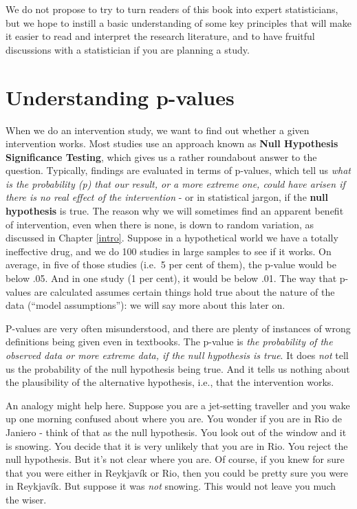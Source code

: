 \documentclass{krantz}
\begin{document}
We do not propose to try to turn readers of this book into expert statisticians, but we hope to instill a basic understanding of some key principles that will make it easier to read and interpret the research literature, and to have fruitful discussions with a statistician if you are planning a study.

\hypertarget{understanding-p-values}{%
\section{Understanding p-values}\label{understanding-p-values}}

When we do an intervention study, we want to find out whether a given intervention works. Most studies use an approach known as \textbf{Null Hypothesis Significance Testing}, which gives us a rather roundabout answer to the question. Typically, findings are evaluated in terms of p-values, which tell us \emph{what is the probability (p) that our result, or a more extreme one, could have arisen if there is no real effect of the intervention} - or in statistical jargon, if the \textbf{null hypothesis} is true. The reason why we will sometimes find an apparent benefit of intervention, even when there is none, is down to random variation, as discussed in Chapter \ref{intro}. Suppose in a hypothetical world we have a totally ineffective drug, and we do 100 studies in large samples to see if it works. On average, in five of those studies (i.e.~5 per cent of them), the p-value would be below .05. And in one study (1 per cent), it would be below .01. The way that p-values are calculated assumes certain things hold true about the nature of the data (``model assumptions''): we will say more about this later on.

P-values are very often misunderstood, and there are plenty of instances of wrong definitions being given even in textbooks. The p-value is \emph{the probability of the observed data or more extreme data, if the null hypothesis is true}. It does \emph{not} tell us the probability of the null hypothesis being true. And it tells us nothing about the plausibility of the alternative hypothesis, i.e., that the intervention works.

An analogy might help here. Suppose you are a jet-setting traveller and you wake up one morning confused about where you are. You wonder if you are in Rio de Janiero - think of that as the null hypothesis. You look out of the window and it is snowing. You decide that it is very unlikely that you are in Rio. You reject the null hypothesis. But it's not clear where you are. Of course, if you knew for sure that you were either in Reykjavík or Rio, then you could be pretty sure you were in Reykjavík. But suppose it was \emph{not} snowing. This would not leave you much the wiser.
\end{document}
